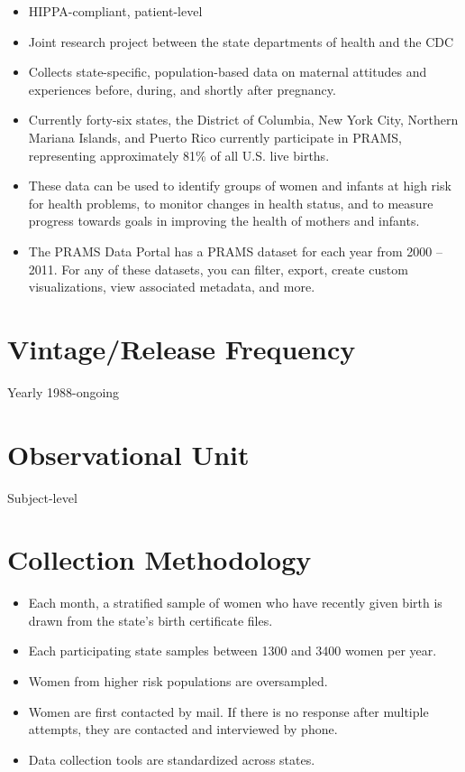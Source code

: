 \documentclass[
]{book}
\providecommand{\tightlist}{%
  \setlength{\itemsep}{0pt}\setlength{\parskip}{0pt}}
\begin{document}
\begin{itemize}
\tightlist
\item
  HIPPA-compliant, patient-level
\item
  Joint research project between the state departments of health and the CDC
\item
  Collects state-specific, population-based data on maternal attitudes and experiences before, during, and shortly after pregnancy.
\item
  Currently forty-six states, the District of Columbia, New York City, Northern Mariana Islands, and Puerto Rico currently participate in PRAMS, representing approximately 81\% of all U.S. live births.
\item
  These data can be used to identify groups of women and infants at high risk for health problems, to monitor changes in health status, and to measure progress towards goals in improving the health of mothers and infants.
\item
  The PRAMS Data Portal has a PRAMS dataset for each year from 2000 -- 2011. For any of these datasets, you can filter, export, create custom visualizations, view associated metadata, and more.
\end{itemize}

\hypertarget{vintagerelease-frequency-74}{%
\section{Vintage/Release Frequency}\label{vintagerelease-frequency-74}}

Yearly 1988-ongoing

\hypertarget{observational-unit-74}{%
\section{Observational Unit}\label{observational-unit-74}}

Subject-level

\hypertarget{collection-methodology-74}{%
\section{Collection Methodology}\label{collection-methodology-74}}

\begin{itemize}
\tightlist
\item
  Each month, a stratified sample of women who have recently given birth is drawn from the state's birth certificate files.
\item
  Each participating state samples between 1300 and 3400 women per year.
\item
  Women from higher risk populations are oversampled.
\item
  Women are first contacted by mail. If there is no response after multiple attempts, they are contacted and interviewed by phone.
\item
  Data collection tools are standardized across states.
\end{itemize}
\end{document}
